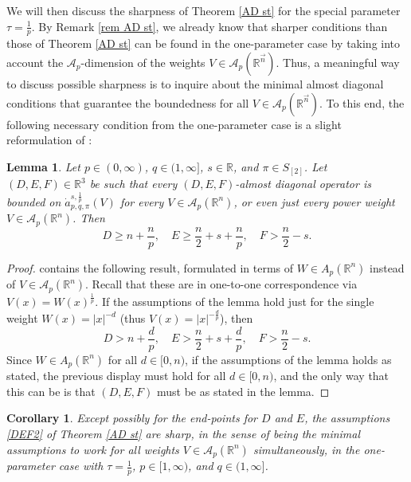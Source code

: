 \documentclass[11pt, reqno]{amsart}
\newtheorem{corollary}[theorem]{Corollary}
\newtheorem{lemma}[theorem]{Lemma}
\theoremstyle{definition}
\theoremstyle{remark}
\numberwithin{equation}{section}
\newcommand{\A}{\mathscr A}
\newcommand{\R}{\mathbb R}
\newcommand{\vn}{\vec n}
\newcommand{\abs}[1]{|#1|}
\begin{document}
We will then discuss the sharpness of Theorem \ref{AD st} for the special parameter $\tau=\frac1p$. By Remark \ref{rem AD st}, we already know that sharper conditions than those of Theorem \ref{AD st} can be found in the one-parameter case by taking into account the $\A_p$-dimension of the weights $V\in\A_p(\R^{\vn})$. Thus, a meaningful way to discuss possible sharpness is to inquire about the minimal almost diagonal conditions that guarantee the boundedness for all $V\in\A_p(\R^{\vn})$. To this end, the following necessary condition from the one-parameter case is a slight reformulation of \cite[Lemma 11.1]{BHYY:1b}:

\begin{lemma}\label{nec 1param}
Let $p\in(0,\infty)$, $q\in(1,\infty]$, $s\in\R$, and $\pi\in S_{[2]}$. Let $(D,E,F)\in\R^3$ be such that every $(D,E,F)$-almost diagonal operator is bounded on $\dot a^{s,\frac1p}_{p,q,\pi}(V)$ for every $V\in\A_p(\R^n)$, or even just every power weight $V\in\A_p(\R^n)$. Then
\begin{equation*}
D\geq n+\frac{n}{p},\quad E\geq\frac{n}{2}+s+\frac{n}{p},\quad F>\frac{n}{2}-s.
\end{equation*}
\end{lemma}

\begin{proof}
\cite[Lemma 11.1]{BHYY:1b} contains the following result, formulated in terms of $W\in A_p(\R^n)$ instead of $V\in\A_p(\R^n)$. Recall that these are in one-to-one correspondence via $V(x)=W(x)^{\frac1p}$. If the assumptions of the lemma hold just for the single weight $W(x)=\abs{x}^{-d}$ (thus $V(x)=\abs{x}^{-\frac{d}{p}}$), then
\begin{equation*}
D> n+\frac{d}{p},\quad E>\frac{n}{2}+s+\frac{d}{p},\quad F>\frac{n}{2}-s.
\end{equation*}
Since $W\in A_p(\R^n)$ for all $d\in[0,n)$, if the assumptions of the lemma holds as stated, the previous display must hold for all $d\in[0,n)$, and the only way that this can be is that $(D,E,F)$ must be as stated in the lemma.
\end{proof}


\begin{corollary}\label{AD st sharp}
Except possibly for the end-points for $D$ and $E$, the assumptions \eqref{DEF2} of Theorem \ref{AD st} are sharp, in the sense of being the minimal assumptions to work for all weights $V\in\A_p(\R^n)$  simultaneously, in the one-parameter case with $\tau=\frac1p$, $p\in[1,\infty)$, and $q\in(1,\infty]$.
\end{corollary}
\end{document}
